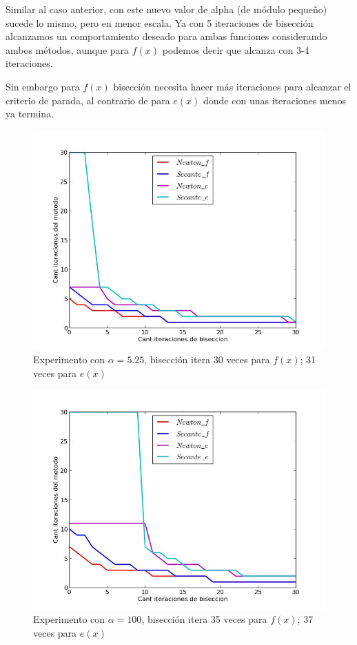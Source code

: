Similar al caso anterior, con este nuevo valor de alpha (de módulo pequeño) sucede lo mismo, pero en menor escala. Ya con 5 iteraciones de bisección alcanzamos un comportamiento deseado para ambas funciones considerando ambos métodos, aunque para $f(x)$ podemos decir que alcanza con 3-4 iteraciones. 

Sin embargo para $f(x)$ bisección necesita hacer más iteraciones para alcanzar el criterio de parada, al contrario de para $e(x)$ donde con unas iteraciones menos ya termina.


\begin{figure}[!h]
	\begin{center}
		  \includegraphics[scale=0.5]{../Imagenes/exp4/experimento_biseccion_3.jpg}
		  \caption{Experimento con $\alpha = 5.25$, bisección itera 30 veces para $f(x)$; 31 veces para $e(x)$}
		  \label{fig:contra1}
	\end{center}
\end{figure}
\FloatBarrier

\begin{figure}[!h]
	\begin{center}
		  \includegraphics[scale=0.5]{../Imagenes/exp4/experimento_biseccion_4.jpg}
		  \caption{Experimento con $\alpha = 100$, bisección itera 35 veces para $f(x)$; 37 veces para $e(x)$}
		  \label{fig:contra1}
	\end{center}
\end{figure}
\FloatBarrier

